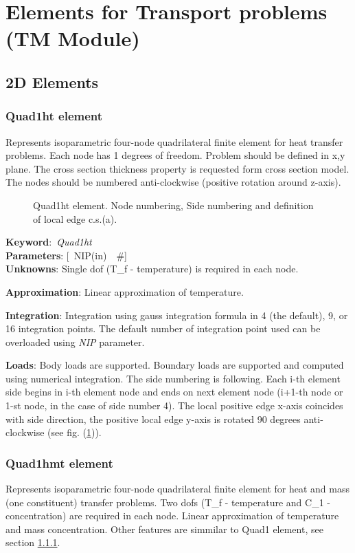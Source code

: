 \documentclass[12pt,dvips]{article}
\newcommand{\descitem}[1]{{\noindent \bf #1}:}
\newcommand{\elemkeyword}[1]{\descitem{Keyword}~{\em #1}}
\newcommand{\elemparam}[2]{{{#1\tiny (#2)}~~\#}}
\newcommand{\optelemparam}[2]{{[~\elemparam{#1}{#2}]}}
\newcommand{\param}[1]{{\it #1}}
\begin{document}
\section{Elements for Transport problems (TM Module)}
\subsection{2D Elements}
\subsubsection{Quad1ht element}
\label{Quad1ht}
Represents isoparametric four-node quadrilateral finite element for
heat transfer problems. Each node has 1 degrees of freedom.
Problem should be defined in x,y plane. The cross section thickness
property is requested form cross section model.
The nodes should be numbered anti-clockwise (positive rotation around
z-axis). 

\begin{figure}[tb]
\begin{center}\end{center}
\caption{Quad1ht element. Node numbering, Side numbering and
definition of local edge c.s.(a).}
\label{Quad1htfig}
\end{figure}

\elemkeyword{Quad1ht}\\
\descitem{Parameters} \optelemparam{NIP}{in}\\
\descitem{Unknowns}
Single dof (T\_f - temperature) is required in each node.

\descitem{Approximation} Linear approximation of temperature.

\descitem{Integration}
Integration using gauss integration formula
in 4 (the default), 9, or 16 integration points. The default number of
integration point used can be overloaded using \param{NIP} parameter.

\descitem{Loads} Body loads are supported. Boundary loads are
supported and computed using numerical integration. The side numbering is
following. Each i-th element side begins in i-th element node and
ends on next element node (i+1-th node or 1-st node, in the case of 
side number 4). The local positive edge x-axis coincides with side
direction, the positive local edge y-axis is rotated 90 degrees
anti-clockwise (see fig. (\ref{Quad1htfig})).

\subsubsection{Quad1hmt element}
Represents isoparametric four-node quadrilateral finite element for
heat and mass (one constituent) transfer problems. 
Two dofs (T\_f - temperature and C\_1 - concentration) are required in
each node. Linear approximation of temperature and mass concentration.
Other features are simmilar to Quad1 element, see section \ref{Quad1ht}.
\end{document}

